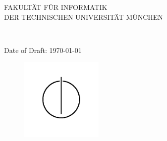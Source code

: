 






\thispagestyle{empty}

\vspace{4cm}
\begin{center}
  \oTUM{4cm}

  \vspace{5mm}
  \huge FAKULT{\"A}T F{\"U}R INFORMATIK\\
  \vspace{0.5cm}
  \large DER TECHNISCHEN UNIVERSIT{\"A}T M{\"U}NCHEN\\
  \vspace{1mm}

\end{center}


\vspace{10mm}
\begin{center}

  {\Large \thedoctype}

  \vspace{10mm}

  \Huge\bf \thetitle\\%


  \vspace{12mm}


  {\LARGE  \theauthor}


  \ifx\final\undefined
  {\Large Date of Draft: \today}
  \else
  \vspace{5mm}
  \fi


  \begin{figure}[h!]
    \centering
    \includegraphics[width=4cm]{styles/informat.png}
  \end{figure}


\end{center}
